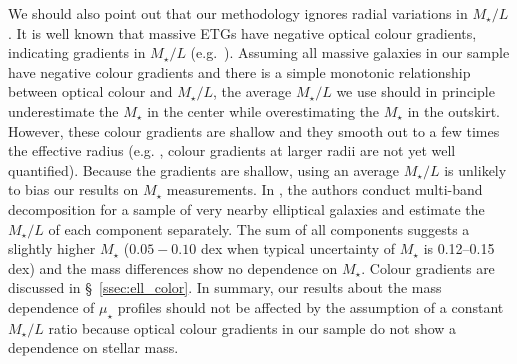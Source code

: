 \documentclass[fleqn,usenatbib]{mnras}
\def\mstar{{$M_{\star}$}}
\def\m2l{{$M_{\star}/L$}}
\def\mden{{$\mu_{\star}$}}
\begin{document}
    We should also point out that our methodology ignores radial variations in \m2l{}. 
    It is well known that massive ETGs have negative optical colour gradients, 
    indicating gradients in \m2l{} (e.g.\ \citealt{Carollo1993, Davies1993, 
    LaBarbera2012, dSouza2015}). 
    Assuming all massive galaxies in our sample have negative colour gradients and 
    there is a simple monotonic relationship between optical colour and \m2l{}, the
    average \m2l{} we use should in principle underestimate the \mstar{} in the 
    center while overestimating the \mstar{} in the outskirt.
    However, these colour gradients are shallow and they smooth out to a few times the 
    effective radius (e.g. \citealt{LaBarbera2010, Tal2011, DSouza2014}, 
    colour gradients at larger radii are not yet well quantified). 
    Because the gradients are shallow, using an average \m2l{} is unlikely to bias 
    our results on \mstar{} measurements.  
    In \citet{Huang2016}, the authors conduct multi-band decomposition for a sample 
    of very nearby elliptical galaxies and estimate the \m2l{} of each component 
    separately. 
    The sum of all components suggests a slightly higher \mstar{} ($0.05-0.10$ dex 
    when typical uncertainty of \mstar{} is 0.12--0.15 dex) and the mass differences 
    show no dependence on \mstar{}. 
    Colour gradients are discussed in \S~\ref{ssec:ell_color}. 
    In summary, our results about the mass dependence of \mden{} profiles should not 
    be affected by the assumption of a constant \m2l{} ratio because optical colour 
    gradients in our sample do not show a dependence on stellar mass.

     
\clearpage

\clearpage

\bsp
\label{lastpage}
\end{document}
